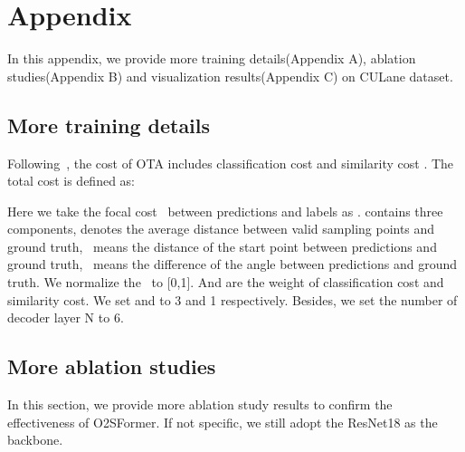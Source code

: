\documentclass{bmvc2k}
\begin{document}
\section*{Appendix}

In this appendix, we provide more training details(Appendix A), 
ablation studies(Appendix B) and visualization results(Appendix C) on CULane dataset.

\renewcommand{\thesubsection}{\Alph{subsection}}
\subsection{More training details}

Following~\cite{zheng2022clrnet}, the cost of OTA includes classification cost  
and similarity cost . The total cost is defined as:

 
 Here we take the focal cost~\cite{lin2017focal} between predictions and labels as .  contains three components,  
 denotes the average distance between valid sampling points and ground truth, \ means the distance of the 
 start point between predictions and ground  truth, \ means the difference of the angle between predictions 
 and ground truth. We normalize the \ to [0,1].  And  are the weight of classification cost 
 and similarity cost. We set  and  to 3 and 1 respectively. Besides, we set the number of decoder layer N to 6.

\subsection{More ablation studies}

In this section, we provide more ablation study results to confirm the effectiveness of O2SFormer. 
If not specific, we still adopt the ResNet18 as the backbone.
\vspace{-0.3cm}
\begin{table}[!h]
   \centering
   \caption{Results of number of lane anchors.}
   \tabcolsep=0.5cm
   \small
 \end{table}
\end{document}
